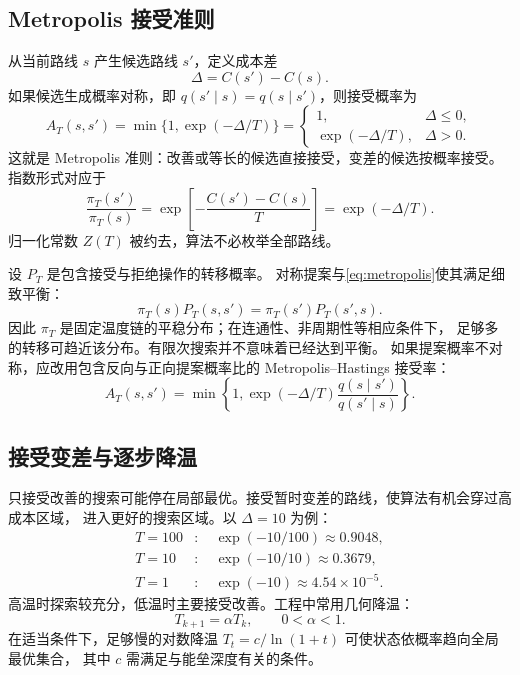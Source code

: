 \documentclass[UTF8,a4paper,11pt,fontset=none]{ctexart}
\numberwithin{equation}{section}
\begin{document}
\subsection{Metropolis 接受准则}
从当前路线 $s$ 产生候选路线 $s'$，定义成本差
\begin{equation}
  \Delta=C(s')-C(s).
  \label{eq:delta}
\end{equation}
如果候选生成概率对称，即 $q(s'\mid s)=q(s\mid s')$，则接受概率为
\begin{equation}
  \boxed{
  A_T(s,s')=\min\{1,\exp(-\Delta/T)\}
  =\begin{cases}
    1, & \Delta\leq0,\\[2pt]
    \exp(-\Delta/T), & \Delta>0.
  \end{cases}}
  \label{eq:metropolis}
\end{equation}
这就是 Metropolis 准则\cite{metropolis}：改善或等长的候选直接接受，变差的候选按概率接受。
指数形式对应于
\begin{equation}
  \frac{\pi_T(s')}{\pi_T(s)}
  =\exp\!\left[-\frac{C(s')-C(s)}{T}\right]
  =\exp(-\Delta/T).
\end{equation}
归一化常数 $Z(T)$ 被约去，算法不必枚举全部路线。

设 $P_T$ 是包含接受与拒绝操作的转移概率。
对称提案与\cref{eq:metropolis}使其满足细致平衡：
\begin{equation}
  \pi_T(s)P_T(s,s')=\pi_T(s')P_T(s',s).
\end{equation}
因此 $\pi_T$ 是固定温度链的平稳分布；在连通性、非周期性等相应条件下，
足够多的转移可趋近该分布。有限次搜索并不意味着已经达到平衡。
如果提案概率不对称，应改用包含反向与正向提案概率比的
Metropolis--Hastings 接受率：
\begin{equation}
  A_T(s,s')=\min\!\left\{1,
    \exp(-\Delta/T)\frac{q(s\mid s')}{q(s'\mid s)}\right\}.
\end{equation}

\subsection{接受变差与逐步降温}
只接受改善的搜索可能停在局部最优。接受暂时变差的路线，使算法有机会穿过高成本区域，
进入更好的搜索区域。以 $\Delta=10$ 为例：
\begin{equation*}
  \begin{aligned}
    T=100&:\quad \exp(-10/100)\approx0.9048,\\
    T=10&:\quad \exp(-10/10)\approx0.3679,\\
    T=1&:\quad \exp(-10)\approx4.54\times10^{-5}.
  \end{aligned}
\end{equation*}
高温时探索较充分，低温时主要接受改善。工程中常用几何降温：
\begin{equation}
  T_{k+1}=\alpha T_k,\qquad 0<\alpha<1.
  \label{eq:cooling}
\end{equation}
在适当条件下，足够慢的对数降温 $T_t=c/\ln(1+t)$ 可使状态依概率趋向全局最优集合，
其中 $c$ 需满足与能垒深度有关的条件\cite{hajek}。
\end{document}
